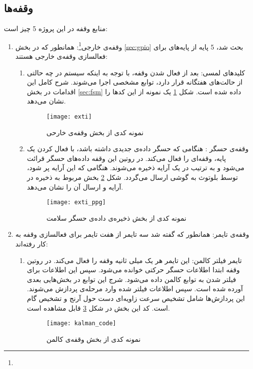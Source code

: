 \subsection{وقفه‌ها}
منابع وقفه در این پروژه 5 چیز است:
\begin{enumerate}
	\item وقفه‌ی خارجی\footnote{}:
	همانطور که در بخش \ref{sec:gpio} بحث شد، 5 پایه از پایه‌های  برای فعالسازی وقفه‌ی خارجی هستند:
	\begin{enumerate}
		\item کلیدهای لمسی:
		بعد از فعال شدن وقفه، با توجه به اینکه سیستم در چه حالتی از حالت‌های هفتگانه قرار دارد، توابع مشخصی اجرا می‌شوند. شرح کامل این اقدامات در بخش \ref{sec:fsm} داده شده است. شکل \ref{fig:exti} یک نمونه از این کدها را نشان می‌دهد.
		\begin{figure}[h]
			\centering
			\texttt{[image: exti]}
			\caption{نمونه کدی از بخش وقفه‌ی خارحی}
			\label{fig:exti}
		\end{figure}
	
		\item وقفه‌ی حسگر : هنگامی که حسگر داده‌ی جدیدی داشته باشد، با فعال کردن یک پایه، وقفه‌ای را فعال می‌کند. در روتین این وقفه داده‌های حسگر قرائت می‌شود و به ترتیب در یک آرایه ذخیره می‌شوند. هنگامی که این آرایه پر شود، توسط بلوتوث به گوشی ارسال می‌گردد. شکل \ref{fig:exti-ppg} بخش مربوط به ذخیره در آرایه و ارسال آن را نشان می‌دهد.
		\begin{figure}[h]
			\centering
			\texttt{[image: exti\_ppg]}
			\caption{نمونه کدی از بخش ذخیره‌ی داده‌ی حسگر سلامت}
			\label{fig:exti-ppg}
		\end{figure}
		
	\end{enumerate}
	\item وقفه‌ی تایمر:
	همانطور که گفته شد سه تایمر از هفت تایمر برای فعالسازی وقفه به کار رفته‌اند:
	\begin{enumerate}
		\item تایمر فیلتر کالمن:
		این تایمر هر یک میلی ثانیه وقفه را فعال می‌کند. در روتین وقفه ابتدا اطلاعات حسگر حرکتی خوانده می‌شود. سپس این اطلاعات برای فیلتر شدن به توابع کالمن داده می‌شود. شرج این توابع در بخش‌هایی بعدی آورده شده است. سپس اطلاعات فیلتر شده وارد مرحله‌ی پردازش می‌شوند. این پردازش‌ها شامل تشخیص سرعت زاویه‌ای دست حول آرنج و تشخیص گام است. کد این بخش در شکل \ref{fig:kalman-code} قابل مشاهده است.
		\begin{figure}[h]
			\centering
			\texttt{[image: kalman\_code]}
			\caption{نمونه کدی از بخش وقفه‌ی کالمن}
			\label{fig:kalman-code}
		\end{figure}
		

\end{enumerate}
\end{enumerate}
